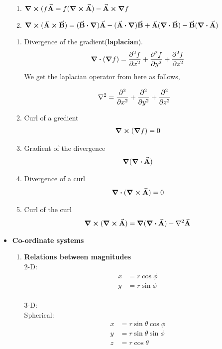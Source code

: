 \documentclass[12pt, oneside]{book}
\begin{document}
\begin{itemize}
\begin{enumerate}
       	\item $\curl{(f\va{A}}=f(\curl{\va{A}})-\va{A}\cross\grad{f}$
       	
       	\item $\curl{(\va{A}\cross\va{B})}=(\va{B}\vdot\grad)\va{A}-(\va{A}\vdot\grad)\va{B}+\va{A}(\div{\va{B}})-\va{B}(\div{\va{A}})$
       \end{enumerate}
   \begin{tcolorbox}[colback=blue!5, colframe=blue!75!black, title=Double derivatives]
   	\begin{enumerate}
   		\item Divergence of the gradient(\textbf{laplacian}). $$\div (\grad{f})=\pdv[2]{f}{x}+\pdv[2]{f}{y}+\pdv[2]{f}{z}$$ We get the laplacian operator from here as follows, 
   		
   		\begin{align}
   			\laplacian&=\pdv[2]{}{x}+\pdv[2]{}{y}+\pdv[2]{}{z}
   		\end{align}
   		\item Curl of a gredient
   		\begin{align}
   			\curl{(\grad{f})}=0
   		\end{align}
   		\item Gradient of the divergence
   		\begin{align}
   			\grad{(\div{\va{A}})}
   		\end{align}
   		\item Divergence of a curl
   		\begin{align}
   			\div{(\curl{\va{A}})}=0
   		\end{align}
   		\item Curl of the curl
   		\begin{align}
   			\curl{(\curl{\va{A}})}=\grad{(\div{\va{A}})}-\laplacian{\va{A}}
   		\end{align}
   		\end{enumerate}
   \end{tcolorbox}
   \item \textbf{Co-ordinate systems}\\
   
   \begin{enumerate}
   	\item \textbf{Relations between magnitudes}\\
   	2-D: 
   	\begin{align}
   		x&=r\cos\phi \\
   		y&=r\sin\phi
   	\end{align}\\
   3-D: \\
   Spherical:\\
   \begin{align}
   	x&=r\sin\theta\cos\phi \\
   	y&=r\sin\theta\sin\phi \\
   	z&=r\cos\theta
   \end{align} \\


\end{enumerate}
\end{itemize}
\end{document}
